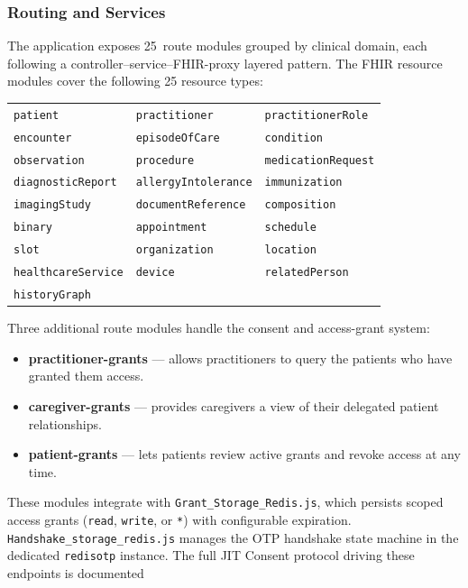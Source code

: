 \subsubsection{Routing and Services}
The application exposes 25~route modules grouped by clinical domain, each
following a controller--service--FHIR-proxy layered pattern. The FHIR resource modules cover the following 25 resource types:
\begin{center}\small
\begin{tabular}{lll}
\texttt{patient} & \texttt{practitioner} & \texttt{practitionerRole} \\
\texttt{encounter} & \texttt{episodeOfCare} & \texttt{condition} \\
\texttt{observation} & \texttt{procedure} & \texttt{medicationRequest} \\
\texttt{diagnosticReport} & \texttt{allergyIntolerance} & \texttt{immunization} \\
\texttt{imagingStudy} & \texttt{documentReference} & \texttt{composition} \\
\texttt{binary} & \texttt{appointment} & \texttt{schedule} \\
\texttt{slot} & \texttt{organization} & \texttt{location} \\
\texttt{healthcareService} & \texttt{device} & \texttt{relatedPerson} \\
\texttt{historyGraph} & & \\
\end{tabular}
\end{center}
Three additional route modules handle the consent and access-grant system:
\begin{itemize}
    \item \textbf{practitioner-grants} --- allows practitioners to query the
          patients who have granted them access.
    \item \textbf{caregiver-grants} --- provides caregivers a view of their
          delegated patient relationships.
    \item \textbf{patient-grants} --- lets patients review active grants and
          revoke access at any time.
\end{itemize}
These modules integrate with \texttt{Grant\_Storage\_Redis.js}, which persists
scoped access grants (\texttt{read}, \texttt{write}, or \texttt{*}) with
configurable expiration. \texttt{Handshake\_storage\_redis.js} manages the OTP
handshake state machine in the dedicated \texttt{redisotp} instance. The full JIT Consent protocol driving these endpoints is documented
